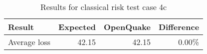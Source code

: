 \begin{table}[htbp]

\centering
\begin{tabular}{ l r r r }

\hline
\rowcolor{anti-flashwhite}
\bf{Result} & \bf{Expected} & \bf{OpenQuake} & \bf{Difference}\\
\hline
Average loss & 42.15 & 42.15 & 0.00\% \\
\hline
\end{tabular}

\caption{Results for classical risk test case 4c}
\label{tab:result-cr-4c}
\end{table}